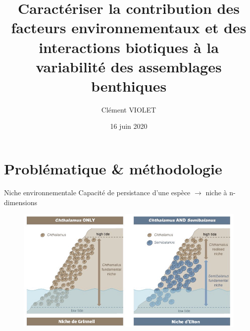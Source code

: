 \documentclass[%
]{beamer}
\title{Caractériser la contribution des facteurs environnementaux et des interactions biotiques à la variabilité des assemblages benthiques}
\date{16 juin 2020}
\author{Clément VIOLET}
\institute{Université de Rennes 1 \par Laboratoire d'Ecologie Benthique Cotière}
\begin{document}
  \maketitle
  
  \section{Problématique \& méthodologie}

  \begin{frame}{Niche environnementale}
	Capacité de persistance d'une espèce $\rightarrow$ niche à n-dimensions~\citep{Hutchinson_1957}\\\vspace{2\baselineskip}
	\pause
	\begin{figure}[t]
		\begin{center}
			\includegraphics[scale = 0.43]{figs/barnacle1_med.png}
		\end{center}
	\end{figure}
	\end{frame}
	
\end{document}
